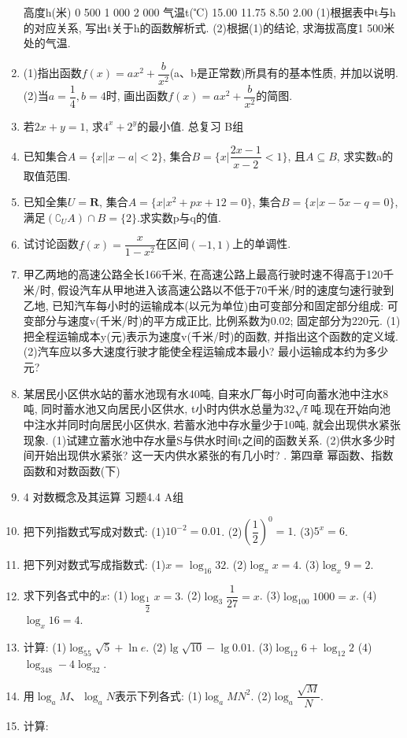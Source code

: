 \documentclass[10pt,a4paper]{article}
\begin{document}
\begin{enumerate}[1.]
高度h(米)	0	500	1 000 	2 000
气温t(℃)	15.00	11.75	8.50	2.00
(1)根据表中t与h的对应关系, 写出t关于h的函数解析式.
(2)根据(1)的结论, 求海拔高度1 500米处的气温.
\item (1)指出函数$f(x)=ax^2+\dfrac b{x^2}$(a、b是正常数)所具有的基本性质, 并加以说明.
(2)当$a=\dfrac 14,b=4$时, 画出函数$f(x)=ax^2+\dfrac b{x^2}$的简图.
\item 若$2x+y=1$, 求$4^x+2^y$的最小值.
总复习
B组
\item 已知集合$A=\{x||x-a|<2\}$, 集合$B=\{x|\dfrac{2x-1}{x-2}<1\}$, 且$A\subseteq B$, 求实数a的取值范围.
\item 已知全集$U=\mathbf{R}$, 集合$A=\{x|x^2+px+12=0\}$, 集合$B=\{x|x-5x-q=0\}$, 满足$(\complement _UA)\cap B=\{2\}$.求实数p与q的值.
\item 试讨论函数$f(x)=\dfrac x{1-x^2}$在区间$(-1,1)$上的单调性.
\item 甲乙两地的高速公路全长166千米, 在高速公路上最高行驶时速不得高于120千米/时, 假设汽车从甲地进入该高速公路以不低于70千米/时的速度匀速行驶到乙地, 已知汽车每小时的运输成本(以元为单位)由可变部分和固定部分组成: 可变部分与速度v(千米/时)的平方成正比, 比例系数为0.02; 固定部分为220元.
(1)把全程运输成本y(元)表示为速度v(千米/时)的函数, 并指出这个函数的定义域.
(2)汽车应以多大速度行驶才能使全程运输成本最小? 最小运输成本约为多少元?
\item 某居民小区供水站的蓄水池现有水40吨, 自来水厂每小时可向蓄水池中注水8吨, 同时蓄水池又向居民小区供水, t小时内供水总量为$32\sqrt t$吨.现在开始向池中注水并同时向居民小区供水, 若蓄水池中存水量少于10吨, 就会出现供水紧张现象.
(1)试建立蓄水池中存水量S与供水时间t之间的函数关系.
(2)供水多少时间开始出现供水紧张? 这一天内供水紧张的有几小时?
.
第四章  幂函数、指数函数和对数函数(下)
\item 4  对数概念及其运算
习题4.4  A组
\item 把下列指数式写成对数式:
(1)$10^{-2}=0.01$.						(2)$(\dfrac 12)^0=1$.
(3)$5^x=6$.
\item 把下列对数式写成指数式:
(1)$x=\log _{16}32$.					(2)$\log _{\pi }x=4$.
(3)$\log _x9=2$.
\item 求下列各式中的$x$:
(1)$\log _{\dfrac 12}x=3$.						(2)$\log _3\dfrac 1{27}=x$.
(3)$\log _{100}1000=x$.					(4)$\log _x16=4$.
\item 计算:
(1)$\log _55\sqrt 5+\ln e$.					(2)$\lg \sqrt {10}-\lg 0.01$.
(3)$\log _{12}6+\log _{12}2$					(4)$\log _348-4\log _32$.
\item 用$\log _aM$、$\log _aN$表示下列各式:
(1)$\log _aMN^2$.						(2)$\log _a\dfrac{\sqrt M}N$.
\item 计算:

\end{enumerate}
\end{document}
